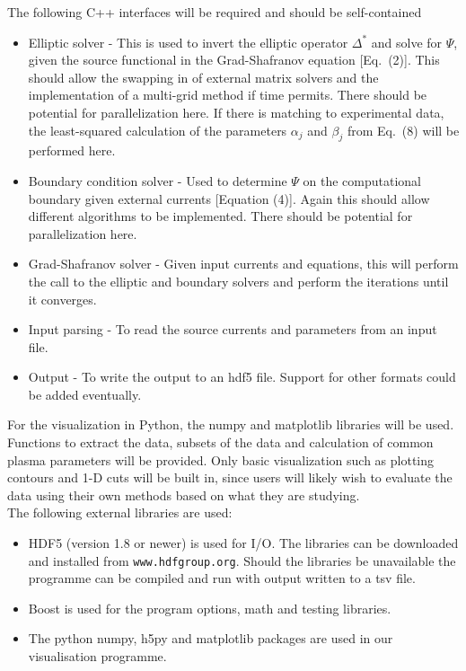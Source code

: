 \documentclass[paper=letter, fontsize=11pt]{scrartcl} %
\begin{document}
\restoregeometry
The following C++ interfaces will be required and should be self-contained
\begin{itemize}
\item Elliptic solver - This is used to invert the elliptic operator $\Delta^*$ and solve for $\Psi$, given the source functional in the Grad-Shafranov equation [Eq.~(2)]. This should allow the swapping in of external matrix solvers and the implementation of a multi-grid method if time permits. There should be potential for parallelization here. If there is matching to experimental data, the least-squared calculation of the parameters $\alpha_j$ and $\beta_j$ from Eq.~(8) will be performed here. 
\item Boundary condition solver - Used to determine $\Psi$ on the computational boundary given external currents [Equation (4)]. Again this should allow different algorithms to be implemented. There should be potential for parallelization here. 
\item Grad-Shafranov solver - Given input currents and equations, this will perform the call to the elliptic and boundary solvers and perform the iterations until it converges.
\item Input parsing - To read the source currents and parameters from an input file.
\item Output - To write the output to an hdf5 file. Support for other formats could be added eventually.
\end{itemize}

For the visualization in Python, the numpy and matplotlib libraries will be used. Functions to extract the data, subsets of the data and calculation of common plasma parameters will be provided. Only basic visualization such as plotting contours and 1-D cuts will be built in, since users will likely wish to evaluate the data using their own methods based on what they are studying. \\

The following external libraries are used:
\begin{itemize}
\item HDF5 (version 1.8 or newer) is used for I/O. The libraries can be downloaded and installed from \texttt{www.hdfgroup.org}. Should the libraries be unavailable the programme can be compiled and run with output written to a tsv file. 
\item Boost is used for the program options, math and testing libraries. 
\item The python numpy, h5py and matplotlib packages are used in our visualisation programme. 
\end{itemize}
\end{document}
